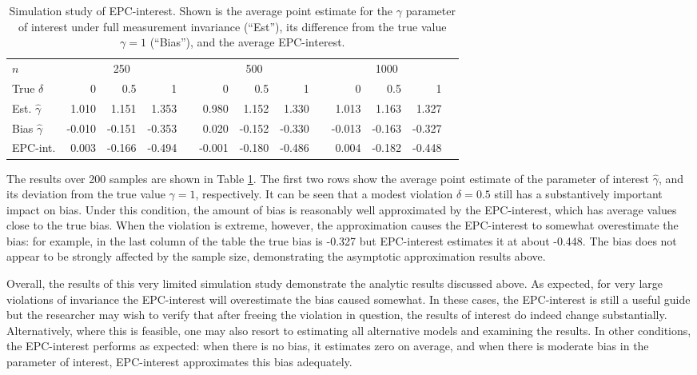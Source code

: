 \documentclass[letterpaper,12pt]{article}
\begin{document}
\begin{table}\begin{small}
\begin{tabular}{lrrrrrrrrrrrr}
\hline
$n$	& \multicolumn{3}{c}{250} && \multicolumn{3}{c}{500} && \multicolumn{3}{c}{1000} \\
	\cline{2-4}	\cline{6-8} 	\cline{10-12}
True $\delta$	&   0	& 0.5	& 1	&& 0	& 0.5	& 1	&& 0	& 0.5	& 1\\
	\hline
	Est. $\hat{\gamma}$	& 1.010	& 1.151	& 1.353	&& 0.980	& 1.152	& 1.330	&& 1.013	& 1.163	& 1.327\\
	Bias $\hat{\gamma}$ & -0.010	& -0.151	& -0.353	& 	& 0.020	& -0.152	& -0.330	& 	& -0.013	& -0.163	& -0.327\\

	EPC-int.	& 0.003	& -0.166	& -0.494&	& -0.001	& -0.180	& -0.486&	& 0.004	& -0.182	& -0.448\\
\hline
\end{tabular}
\caption{Simulation study of EPC-interest. Shown is the average point estimate for the $\gamma$ parameter of interest under full measurement invariance (``Est''), its difference from the true value $\gamma=1$ (``Bias''), and the average EPC-interest.}
\label{tab:simulation}
\end{small}\end{table}

The results over 200 samples are shown in Table \ref{tab:simulation}. The first two rows  show the average point estimate of the parameter of interest $\hat{\gamma}$, and its deviation from the true value $\gamma = 1$, respectively. It can be seen that a modest violation $\delta = 0.5$ still has a substantively important impact on bias. Under this condition, the amount of bias is reasonably well approximated by the EPC-interest, which has average values close to the true bias. When the violation is extreme, however, the approximation causes the EPC-interest to somewhat overestimate the bias: for example, in the last column of the table the true bias is -0.327 but EPC-interest estimates it at about -0.448. The bias does not appear to be strongly affected by the sample size, demonstrating the asymptotic approximation results above. 


Overall, the results of this very limited simulation study demonstrate the analytic results discussed above. As expected, for very large violations of invariance the EPC-interest will overestimate the bias caused somewhat. In these cases, the EPC-interest is still a useful guide but the researcher may wish to verify that after freeing the violation in question, the results of interest do indeed change substantially. Alternatively, where this is feasible, one may also resort to estimating all alternative models and examining the results. In other conditions, the EPC-interest performs as expected: when there is no bias, it estimates zero on average, and when there is moderate bias in the parameter of interest, EPC-interest approximates this bias adequately. 
\end{document}
